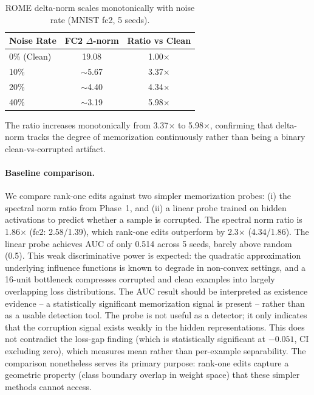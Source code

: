 \documentclass{article}
\begin{document}
\begin{table}[t]
  \centering
  \caption{ROME delta-norm scales monotonically with noise rate (MNIST fc2, 5 seeds).}
  \label{tab:noise_sweep}
  \begin{tabular}{lcc}
    \toprule
    Noise Rate & FC2 $\Delta$-norm & Ratio vs Clean \\
    \midrule
    0\% (Clean) & 19.08 & 1.00$\times$ \\
    10\% & $\sim$5.67 & 3.37$\times$ \\
    20\% & $\sim$4.40 & 4.34$\times$ \\
    40\% & $\sim$3.19 & 5.98$\times$ \\
    \bottomrule
  \end{tabular}
\end{table}

The ratio increases monotonically from 3.37$\times$ to 5.98$\times$, confirming that delta-norm tracks the degree of memorization continuously rather than being a binary clean-vs-corrupted artifact.

\paragraph{Baseline comparison.} We compare rank-one edits against two simpler memorization probes: (i) the spectral norm ratio from Phase~1, and (ii) a linear probe trained on hidden activations to predict whether a sample is corrupted. The spectral norm ratio is 1.86$\times$ (fc2: 2.58/1.39), which rank-one edits outperform by 2.3$\times$ (4.34/1.86). The linear probe achieves AUC of only 0.514 across 5 seeds, barely above random (0.5). This weak discriminative power is expected: the quadratic approximation underlying influence functions is known to degrade in non-convex settings, and a 16-unit bottleneck compresses corrupted and clean examples into largely overlapping loss distributions. The AUC result should be interpreted as existence evidence -- a statistically significant memorization signal is present -- rather than as a usable detection tool. The probe is not useful as a detector; it only indicates that the corruption signal exists weakly in the hidden representations. This does not contradict the loss-gap finding (which is statistically significant at $-0.051$, CI excluding zero), which measures mean rather than per-example separability. The comparison nonetheless serves its primary purpose: rank-one edits capture a geometric property (class boundary overlap in weight space) that these simpler methods cannot access.
\end{document}
